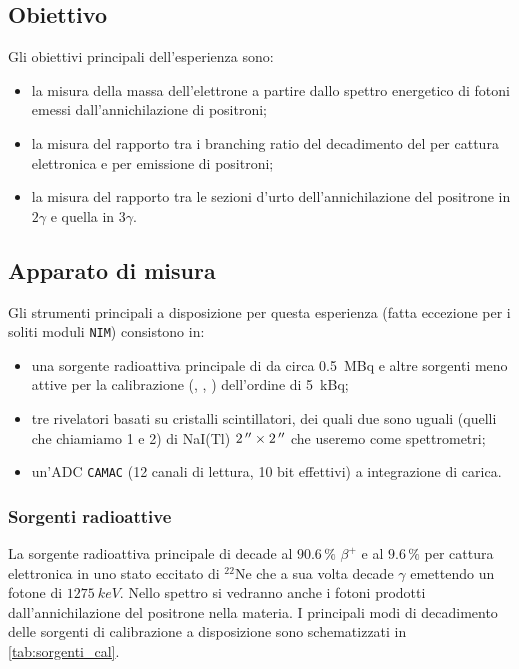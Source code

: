 \subsection{Obiettivo}
Gli obiettivi principali dell'esperienza sono:
\begin{itemize}
	\item la misura della massa dell'elettrone a partire dallo spettro energetico di fotoni emessi dall'annichilazione di positroni;
	\item la misura del rapporto tra i branching ratio del decadimento del  \na{} per cattura elettronica e per emissione di positroni;
	\item la misura del rapporto tra le sezioni d'urto dell'annichilazione del positrone in $2\gamma$ e quella in $3\gamma$.
\end{itemize}

\subsection{Apparato di misura}
Gli strumenti principali a disposizione per questa esperienza (fatta eccezione per i soliti moduli \texttt{NIM}) consistono in:
\begin{itemize}
	\item una sorgente radioattiva principale di \na{} da circa \SI{0.5}{MBq}
	e altre sorgenti meno attive per la calibrazione (\na, \cs, \co) dell'ordine di \SI{5}{kBq};
	\item tre rivelatori basati su cristalli scintillatori,
	dei quali due sono uguali (quelli che chiamiamo 1 e 2) di NaI(Tl) $\SI2{''}\times\SI2{''}$
	che useremo come spettrometri;
	\item un'ADC \texttt{CAMAC} (12 canali di lettura, 10 bit effettivi) a integrazione di carica.
\end{itemize}

\subsubsection{Sorgenti radioattive}

La sorgente radioattiva principale di \na{} decade al $90.6\,\%$ $\beta^+$ e al $9.6\,\%$ per cattura elettronica in uno stato eccitato di $^{22}$Ne che a sua volta decade $\gamma$ emettendo un fotone di $\SI{1275}{keV}$. Nello spettro si vedranno anche i fotoni prodotti dall'annichilazione del positrone nella materia.
I principali modi di decadimento delle sorgenti di calibrazione a disposizione sono schematizzati in \autoref{tab:sorgenti_cal}.

